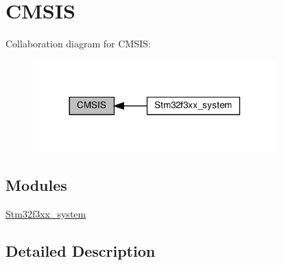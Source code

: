 \hypertarget{group__CMSIS}{}\section{C\+M\+S\+IS}
\label{group__CMSIS}
Collaboration diagram for C\+M\+S\+IS\+:\nopagebreak
\begin{figure}[H]
\begin{center}
\leavevmode
\includegraphics[width=266pt]{group__CMSIS}
\end{center}
\end{figure}
\subsection*{Modules}
\begin{DoxyCompactItemize}
\item 
\hyperlink{group__stm32f3xx__system}{Stm32f3xx\+\_\+system}
\end{DoxyCompactItemize}


\subsection{Detailed Description}
